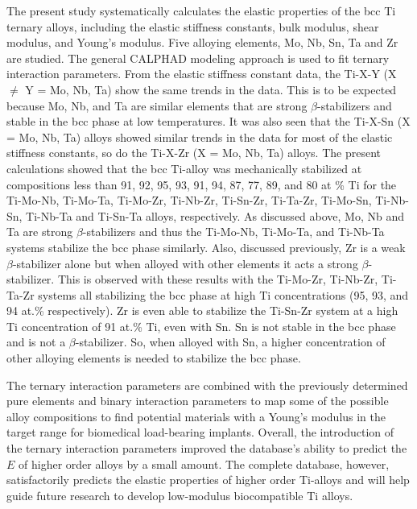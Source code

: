The present study systematically calculates the elastic properties of the bcc Ti ternary alloys, including the elastic stiffness constants, bulk modulus, shear modulus, and Young's modulus. Five alloying elements, Mo, Nb, Sn, Ta and Zr are studied. The general CALPHAD modeling approach is used to fit ternary interaction parameters. From the elastic stiffness constant data, the Ti-X-Y (X $\neq$ Y = Mo, Nb, Ta) show the same trends in the data. This is to be expected because Mo, Nb, and Ta are similar elements that are strong $\beta$-stabilizers and stable in the bcc phase at low temperatures. It was also seen that the Ti-X-Sn (X = Mo, Nb, Ta) alloys showed similar trends in the data for most of the elastic stiffness constants, so do the Ti-X-Zr (X = Mo, Nb, Ta) alloys. The present calculations showed that the bcc Ti-alloy was mechanically stabilized at compositions less than 91, 92, 95, 93, 91, 94, 87, 77, 89, and 80 at \% Ti for the Ti-Mo-Nb, Ti-Mo-Ta, Ti-Mo-Zr, Ti-Nb-Zr, Ti-Sn-Zr, Ti-Ta-Zr, Ti-Mo-Sn, Ti-Nb-Sn, Ti-Nb-Ta and Ti-Sn-Ta alloys, respectively. As discussed above, Mo, Nb and Ta are strong $\beta$-stabilizers and thus the Ti-Mo-Nb, Ti-Mo-Ta, and Ti-Nb-Ta systems stabilize the bcc phase similarly. Also, discussed previously, Zr is a weak $\beta$-stabilizer alone but when alloyed with other elements it acts a strong $\beta$-stabilizer. This is observed with these results with the Ti-Mo-Zr, Ti-Nb-Zr, Ti-Ta-Zr systems all stabilizing the bcc phase at high Ti concentrations (95, 93, and 94 at.\% respectively). Zr is even able to stabilize the Ti-Sn-Zr system at a high Ti concentration of 91 at.\% Ti, even with Sn. Sn is not stable in the bcc phase and is not a $\beta$-stabilizer. So, when alloyed with Sn, a higher concentration of other alloying elements is needed to stabilize the bcc phase. 

The ternary interaction parameters are combined with the previously determined pure elements and binary interaction parameters to map some of the possible alloy compositions to find potential materials with a Young's modulus in the target range for biomedical load-bearing implants. Overall, the introduction of the ternary interaction parameters improved the database's ability to predict the $E$ of higher order alloys by a small amount. The complete database, however, satisfactorily predicts the elastic properties of higher order Ti-alloys and will help guide future research to develop low-modulus biocompatible Ti alloys.

